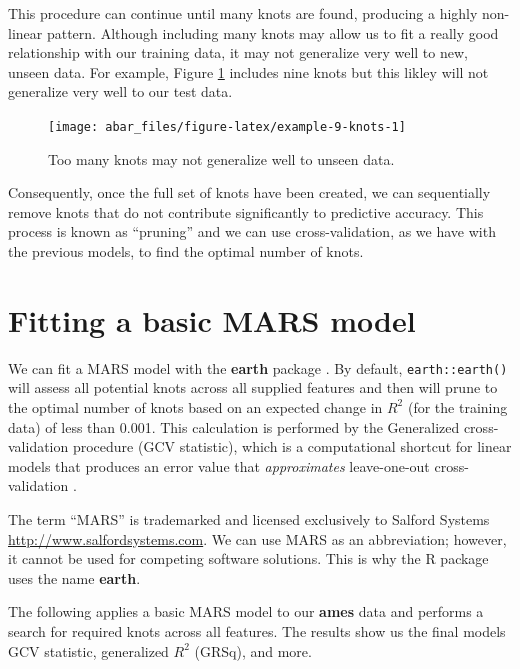 \documentclass[]{book}
\theoremstyle{definition}
\theoremstyle{definition}
\theoremstyle{definition}
\theoremstyle{remark}
\begin{document}
This procedure can continue until many knots are found, producing a
highly non-linear pattern. Although including many knots may allow us to
fit a really good relationship with our training data, it may not
generalize very well to new, unseen data. For example, Figure
\ref{fig:example-9-knots} includes nine knots but this likley will not
generalize very well to our test data.

\begin{figure}

{\centering \texttt{[image: abar\_files/figure-latex/example-9-knots-1]} 

}

\caption{Too many knots may not generalize well to unseen data.}\label{fig:example-9-knots}
\end{figure}

Consequently, once the full set of knots have been created, we can
sequentially remove knots that do not contribute significantly to
predictive accuracy. This process is known as ``pruning'' and we can use
cross-validation, as we have with the previous models, to find the
optimal number of knots.

\hypertarget{fitting-a-basic-mars-model}{%
\section{Fitting a basic MARS model}\label{fitting-a-basic-mars-model}}

We can fit a MARS model with the \textbf{earth} package \citep{R-earth}.
By default, \texttt{earth::earth()} will assess all potential knots
across all supplied features and then will prune to the optimal number
of knots based on an expected change in \(R^2\) (for the training data)
of less than 0.001. This calculation is performed by the Generalized
cross-validation procedure (GCV statistic), which is a computational
shortcut for linear models that produces an error value that
\emph{approximates} leave-one-out cross-validation
\citep{golub1979generalized}.

\begin{note}
The term ``MARS'' is trademarked and licensed exclusively to Salford
Systems \url{http://www.salfordsystems.com}. We can use MARS as an
abbreviation; however, it cannot be used for competing software
solutions. This is why the R package uses the name \textbf{earth}.
\end{note}

The following applies a basic MARS model to our \textbf{ames} data and
performs a search for required knots across all features. The results
show us the final models GCV statistic, generalized \(R^2\) (GRSq), and
more.
\end{document}
